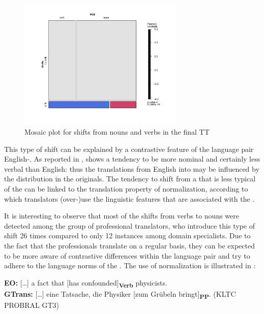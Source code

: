 \documentclass[output=paper]{LSP/langsci}
\begin{document}
\begin{figure}
\includegraphics[width=0.7\textwidth]{figures/serbinaetal/serbinaetal1.pdf}
\caption{Mosaic plot for shifts from nouns and verbs in the final TT}
\label{serbinaetal:fig:2}
\end{figure}

This type of shift can be explained by a contrastive feature of the language pair English-. As reported in ,  shows a tendency to be more nominal and certainly less verbal than English: thus the translations from English into  may be influenced by the  distribution in the  originals. The tendency to shift from a  that is less typical of the  can be linked to the translation property of normalization, according to which translators (over-)use the linguistic features that are associated with the  \citep[176]{Baker1996}. 

It is interesting to observe that most of the shifts from verbs to nouns were detected among the group of professional translators, who introduce this type of shift 26 times compared to only 12 instances among domain specialists. Due to the fact that the professionals translate on a regular basis, they can be expected to be more aware of contrastive differences within the language pair and try to adhere to the language norms of the . The use of normalization is illustrated in :

\ea \label{serbinaetal:ex:5}
\textbf{EO:} [\ldots] a fact that $[$has confounded$]$\textsubscript{\textbf{Verb}} physicists. \\
\textbf{GTrans:} [\ldots] eine Tatsache, die Physiker $[$zum Grübeln bringt$]$\textsubscript{\textbf{PP}}. (KLTC PROBRAL GT3)
\z
\end{document}
